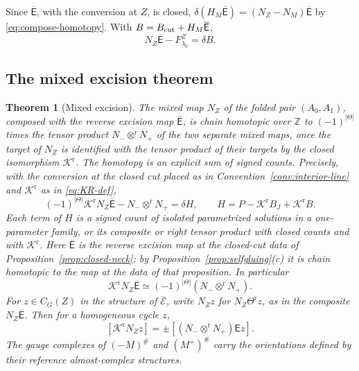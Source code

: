 \documentclass[11pt]{amsart}
\newtheorem{theorem}{Theorem}[section]
\theoremstyle{definition}
\theoremstyle{remark}
\theoremstyle{plain}
\numberwithin{equation}{section}
\newcommand{\ZZ}{\mathbb Z}
\begin{document}
Since $\overline{\mathsf E}$, with the conversion at $Z$, is closed,
$\delta(H_M\overline{\mathsf E})=(N_Z-N_M)\overline{\mathsf E}$ by
\eqref{eq:compose-homotopy}. With
$B=B_{\rm cut}+H_M\overline{\mathsf E}$,
\begin{equation}\label{eq:neck-homotopy}
 N_Z\overline{\mathsf E}-F^Z_{\lambda_0}=\delta B .
\end{equation}

\subsection{The mixed excision theorem}
\label{subsec:mixed-excision}
\begin{theorem}[Mixed excision]\label{thm:mixed-excision}
The mixed map $N_Z$ of the folded pair $(A_0,A_1)$, composed with the
reverse excision map $\overline{\mathsf E}$, is chain homotopic over $\ZZ$
to $(-1)^{|\Theta|}$ times the tensor product $N_-\otimes^{\mathrm r}N_+$ of the two separate
mixed maps, once the target of $N_Z$ is identified with the tensor product
of their targets by the closed isomorphism $\mathcal K^{\mathrm r}$. The homotopy is
an explicit sum of signed counts. Precisely, with the conversion at the
closed cut placed as in Convention~\ref{conv:interior-line} and
$\mathcal K^{\mathrm r}$ as in \eqref{eq:KR-def},
\begin{equation}\label{eq:excision-explicit}
 (-1)^{|\Theta|}\mathcal K^{\mathrm r}N_Z\overline{\mathsf E}-N_-\otimes^{\mathrm r}N_+=\delta H,
 \qquad
 H=P-\mathcal K^{\mathrm r}B_J+\mathcal K^{\mathrm r}B .
\end{equation}
Each term of $H$ is a signed count of isolated parametrized solutions in
a one-parameter family, or its composite or right tensor product with
closed counts and with $\mathcal K^{\mathrm r}$. Here $\overline{\mathsf E}$ is the
reverse excision map at the closed-cut data of
Proposition~\ref{prop:closed-neck}; by Proposition~\ref{prop:selfgluing}(c)
it is chain homotopic to the map at the data of that proposition. In
particular
\begin{equation}\label{eq:excision-reverse}
 \mathcal K^{\mathrm r}N_Z\overline{\mathsf E}\simeq(-1)^{|\Theta|}(N_-\otimes^{\mathrm r}N_+).
\end{equation}
For $z\in C_G(Z)$ in the structure of $\overline{\mathcal E}$, write
$N_Zz$ for $N_Z\Theta^{\mathrm r}z$, as in the composite
$N_Z\overline{\mathsf E}$. Then for a homogeneous cycle $z$,
\begin{equation}\label{eq:excision-cycle}
 [\mathcal K^{\mathrm r}N_Zz]=\pm[(N_-\otimes^{\mathrm r}N_+)\mathsf Ez].
\end{equation}
The gauge complexes of $(-M)^\#$ and $(M^+)^\#$ carry the orientations
defined by their reference almost-complex structures.
\end{theorem}
\end{document}
